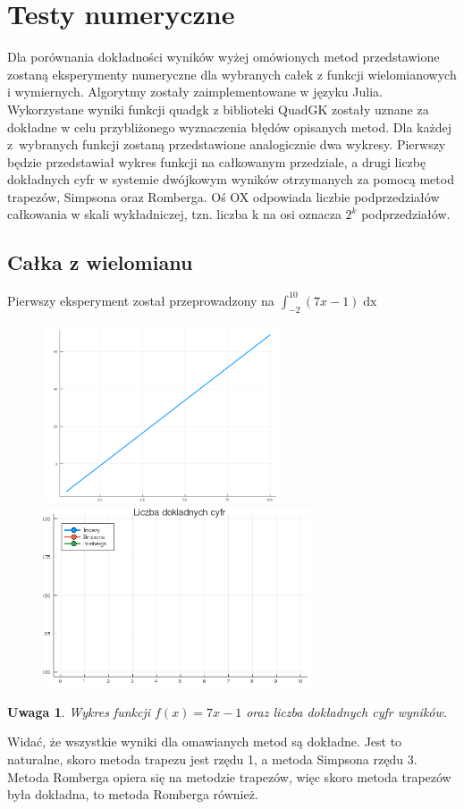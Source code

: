 \documentclass[11pt,wide]{article}
\newtheorem{remark}{Uwaga}
\begin{document}
\pagebreak
\section{Testy numeryczne}
Dla porównania dokładności wyników wyżej omówionych metod przedstawione zostaną eksperymenty numeryczne dla wybranych całek z funkcji wielomianowych i wymiernych. Algorytmy zostały zaimplementowane w języku Julia. Wykorzystane wyniki funkcji quadgk z biblioteki QuadGK zostały uznane za dokładne w celu przybliżonego wyznaczenia błędów opisanych metod. Dla każdej z~wybranych funkcji zostaną przedstawione analogicznie dwa wykresy. Pierwszy będzie przedstawiał wykres funkcji na całkowanym przedziale, a drugi liczbę dokładnych cyfr w systemie dwójkowym wyników otrzymanych za pomocą metod trapezów, Simpsona oraz Romberga. Oś OX odpowiada liczbie podprzedziałów całkowania w skali wykładniczej, tzn. liczba k na osi oznacza \(2^k\) podprzedziałów. 

\subsection{Całka z wielomianu}
Pierwszy eksperyment został przeprowadzony na \(\displaystyle \int_{-2}^{10} (7x -1)\mathop{dx} \)
\begin{figure}[h!]
	\includegraphics[width=70mm,scale=0.5]{wiel1}
	\includegraphics[width=80mm,scale=0.5]{wiel_blad1}
\end{figure}
\begin{remark}
\centering
Wykres funkcji \(f(x) = 7x -1 \) oraz liczba dokładnych cyfr wyników.
\end{remark}
Widać, że wszystkie wyniki dla omawianych metod są dokładne. Jest to naturalne, skoro metoda trapezu jest rzędu 1, a metoda Simpsona rzędu 3. Metoda Romberga opiera się na metodzie trapezów, więc skoro metoda trapezów była dokładna, to metoda Romberga również. 
\pagebreak
\end{document}
